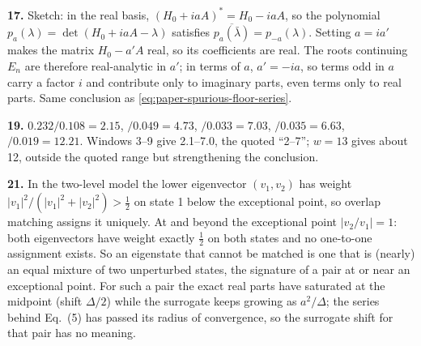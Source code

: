 \textbf{17.} Sketch: in the real basis, $(H_0+iaA)^*=H_0-iaA$, so the polynomial $p_a(\lambda)=\det(H_0+iaA-\lambda)$ satisfies $\overline{p_a(\bar\lambda)}=p_{-a}(\lambda)$. Setting $a=ia'$ makes the matrix $H_0-a'A$ real, so its coefficients are real. The roots continuing $E_n$ are therefore real-analytic in $a'$; in terms of $a$, $a'=-ia$, so terms odd in $a$ carry a factor $i$ and contribute only to imaginary parts, even terms only to real parts. Same conclusion as \cref{eq:paper-spurious-floor-series}.

\textbf{19.} $0.232/0.108=2.15$, $/0.049=4.73$, $/0.033=7.03$, $/0.035=6.63$, $/0.019=12.21$. Windows 3--9 give 2.1--7.0, the quoted ``2--7''; $w=13$ gives about 12, outside the quoted range but strengthening the conclusion.

\textbf{21.} In the two-level model the lower eigenvector $(v_1,v_2)$ has weight $|v_1|^2/(|v_1|^2+|v_2|^2)>\tfrac12$ on state 1 below the exceptional point, so overlap matching assigns it uniquely. At and beyond the exceptional point $|v_2/v_1|=1$: both eigenvectors have weight exactly $\tfrac12$ on both states and no one-to-one assignment exists. So an eigenstate that cannot be matched is one that is (nearly) an equal mixture of two unperturbed states, the signature of a pair at or near an exceptional point. For such a pair the exact real parts have saturated at the midpoint (shift $\Delta/2$) while the surrogate keeps growing as $a^2/\Delta$; the series behind Eq.~(5) has passed its radius of convergence, so the surrogate shift for that pair has no meaning.
